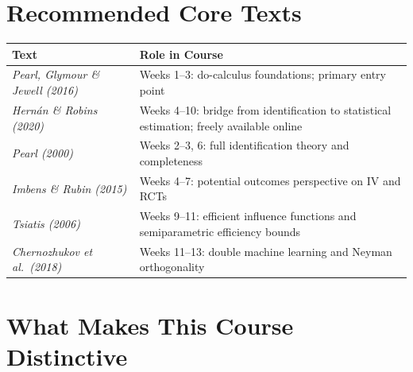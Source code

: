 \documentclass[12pt]{article}
\begin{document}
\section{Recommended Core Texts}

\begingroup
\small
\setlength{\tabcolsep}{6pt}
\renewcommand{\arraystretch}{1.4}

\begin{tabularx}{\linewidth}{L{5.2cm} X}
  \toprule
  \color{white}\textbf{Text} &
  \color{white}\textbf{Role in Course} \\
  \midrule
  \textit{Pearl, Glymour \& Jewell (2016)}
    & Weeks 1--3: do-calculus foundations; primary entry point \\
  \textit{Hern\'an \& Robins (2020)}
    & Weeks 4--10: bridge from identification to statistical
      estimation; freely available online \\
  \textit{Pearl (2000)}
    & Weeks 2--3, 6: full identification theory and completeness \\
  \textit{Imbens \& Rubin (2015)}
    & Weeks 4--7: potential outcomes perspective on IV and RCTs \\
  \textit{Tsiatis (2006)}
    & Weeks 9--11: efficient influence functions and semiparametric
      efficiency bounds \\
  \textit{Chernozhukov et al.\ (2018)}
    & Weeks 11--13: double machine learning and Neyman orthogonality \\
  \bottomrule
\end{tabularx}
\endgroup

\section{What Makes This Course Distinctive}
\end{document}
